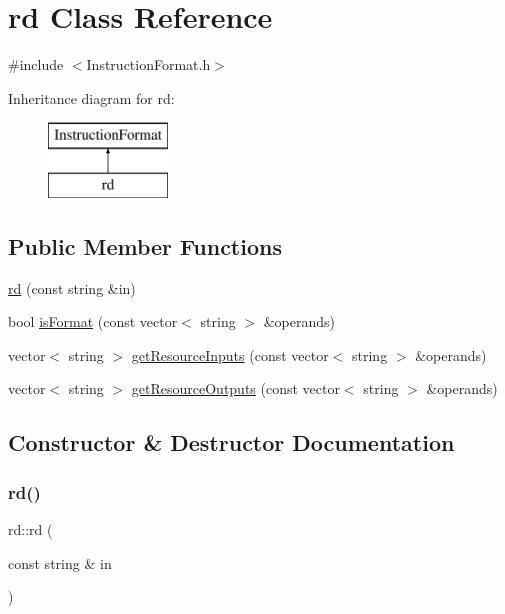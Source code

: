 \hypertarget{classrd}{}\section{rd Class Reference}
\label{classrd}


{\ttfamily \#include $<$Instruction\+Format.\+h$>$}

Inheritance diagram for rd\+:\begin{figure}[H]
\begin{center}
\leavevmode
\includegraphics[height=2.000000cm]{classrd}
\end{center}
\end{figure}
\subsection*{Public Member Functions}
\begin{DoxyCompactItemize}
\item 
\hyperlink{classrd_abd7bd495bec1c605e6f62f4762992597}{rd} (const string \&in)
\item 
bool \hyperlink{classrd_a8a37174ea94c394743494d3e735d6363}{is\+Format} (const vector$<$ string $>$ \&operands)
\item 
vector$<$ string $>$ \hyperlink{classrd_a06b5b25f6e269bb121ad8ab63283f599}{get\+Resource\+Inputs} (const vector$<$ string $>$ \&operands)
\item 
vector$<$ string $>$ \hyperlink{classrd_a148dde5e9f8d3c68d5563dd8ec2c1bff}{get\+Resource\+Outputs} (const vector$<$ string $>$ \&operands)
\end{DoxyCompactItemize}


\subsection{Constructor \& Destructor Documentation}
\mbox{\label{classrd_abd7bd495bec1c605e6f62f4762992597}} 
\subsubsection{\texorpdfstring{rd()}{rd()}}
{\footnotesize\ttfamily rd\+::rd (\begin{DoxyParamCaption}\item[{const string \&}]{in }\end{DoxyParamCaption})}

